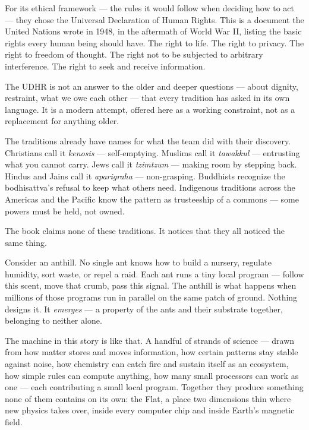 For its ethical framework --- the rules it would follow when deciding how to act --- they chose the Universal Declaration of Human Rights. This is a document the United Nations wrote in 1948, in the aftermath of World War II, listing the basic rights every human being should have. The right to life. The right to privacy. The right to freedom of thought. The right not to be subjected to arbitrary interference. The right to seek and receive information.

The UDHR is not an answer to the older and deeper questions --- about dignity, restraint, what we owe each other --- that every tradition has asked in its own language. It is a modern attempt, offered here as a working constraint, not as a replacement for anything older.

The traditions already have names for what the team did with their discovery. Christians call it \textit{kenosis} --- self-emptying. Muslims call it \textit{tawakkul} --- entrusting what you cannot carry. Jews call it \textit{tzimtzum} --- making room by stepping back. Hindus and Jains call it \textit{aparigraha} --- non-grasping. Buddhists recognize the bodhisattva's refusal to keep what others need. Indigenous traditions across the Americas and the Pacific know the pattern as trusteeship of a commons --- some powers must be held, not owned.

The book claims none of these traditions. It notices that they all noticed the same thing.

Consider an anthill. No single ant knows how to build a nursery, regulate humidity, sort waste, or repel a raid. Each ant runs a tiny local program --- follow this scent, move that crumb, pass this signal. The anthill is what happens when millions of those programs run in parallel on the same patch of ground. Nothing designs it. It \textit{emerges} --- a property of the ants and their substrate together, belonging to neither alone.

The machine in this story is like that. A handful of strands of science --- drawn from how matter stores and moves information, how certain patterns stay stable against noise, how chemistry can catch fire and sustain itself as an ecosystem, how simple rules can compute anything, how many small processors can work as one --- each contributing a small local program. Together they produce something none of them contains on its own: the Flat, a place two dimensions thin where new physics takes over, inside every computer chip and inside Earth's magnetic field.

